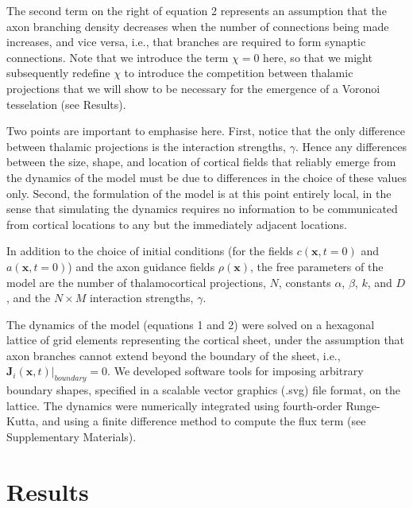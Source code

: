 \documentclass[a4paper,11pt]{article}
\newcommand{\cmnt}[1]{\textcolor{blue}{#1}}
\newcommand{\code}[1]{\textsf{#1}}
\newcommand{\mb}[1]{\mathbf{#1}}
\begin{document}
The second term on the right of equation 2 represents an assumption that the
axon branching density decreases when the number of connections being made
increases, and vice versa, i.e., that branches are required to form synaptic
connections. Note that we introduce the term $\chi=0$ here, so that we might
subsequently redefine $\chi$ to introduce the competition between thalamic
projections that we will show to be necessary for the emergence of a Voronoi
tesselation (see Results).

Two points are important to emphasise here. First, notice that the only
difference between thalamic projections is the interaction strengths,
$\gamma$. Hence any differences between the size, shape, and location of
cortical fields that reliably emerge from the dynamics of the model must be
due to differences in the choice of these values only. Second, the formulation
of the model is at this point entirely local, in the sense that simulating the
dynamics requires no information to be communicated from cortical locations to
any but the immediately adjacent locations.

In addition to the choice of initial conditions (for the fields
$c(\mb{x},t=0)$ and $a(\mb{x},t=0)$) and the axon guidance fields
$\rho(\mb{x})$, the free parameters of the model are the number of
thalamocortical projections, $N$, constants $\alpha$, $\beta$, $k$, and $D$,
and the $N\times M$ interaction strengths, $\gamma$.

The dynamics of the model (equations 1 and 2) were solved on a hexagonal
lattice of grid elements representing the cortical sheet, under the assumption
that axon branches cannot extend beyond the boundary of the sheet, i.e.,
$\mb{J}_i(\mb{x},t) \bigg\rvert_{boundary} = 0$. We developed software tools
for imposing arbitrary boundary shapes, specified in a scalable vector
graphics (.svg) file format, on the lattice. The dynamics were numerically
integrated using fourth-order Runge-Kutta, and using a {\color{red} finite
  difference method} to compute the flux term (see Supplementary Materials).

\section*{Results}

\end{document}
